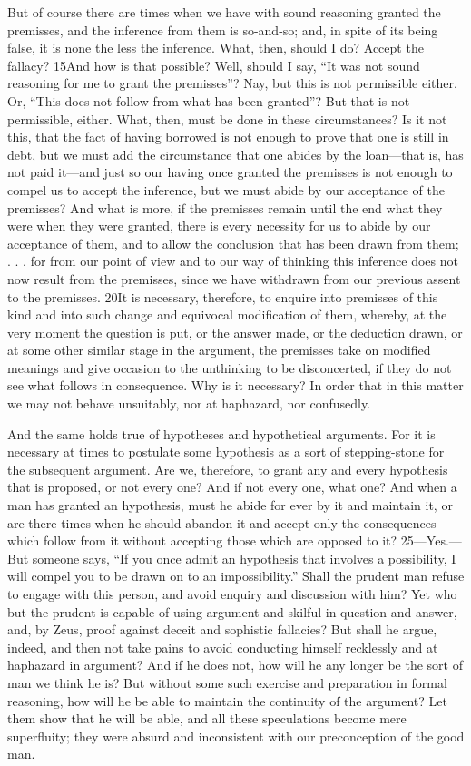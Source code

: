But of course there are times when we have with sound reasoning granted the premisses, and the inference from them is so-and-so; and, in spite of its being false, it is none the less the inference. What, then, should I do? Accept the fallacy? 15And how is that possible? Well, should I say, ``It was not sound reasoning for me to grant the premisses''? Nay, but this is not permissible either. Or, ``This does not follow from what has been granted''? But that is not permissible, either. What, then, must be done in these circumstances? Is it not this, that the fact of having borrowed is not enough to prove that one is still in debt, but we must add the circumstance that one abides by the loan—that is, has not paid it—and just so our having once granted the premisses is not enough to compel us to accept the inference, but we must abide by our acceptance of the premisses? And what is more, if the premisses remain until the end what they were when they were granted, there is every necessity for us to abide by our acceptance of them, and to allow the conclusion that has been drawn from them; . . . for from our point of view and to our way of thinking this inference does not now result from the premisses, since we have withdrawn from our previous assent to the premisses. 20It is necessary, therefore, to enquire into premisses of this kind and into such change and equivocal modification of them, whereby, at the very moment the question is put, or the answer made, or the deduction drawn, or at some other similar stage in the argument, the premisses take on modified meanings and give occasion to the unthinking to be disconcerted, if they do not see what follows in consequence. Why is it necessary? In order that in this matter we may not behave unsuitably, nor at haphazard, nor confusedly.

And the same holds true of hypotheses and hypothetical arguments. For it is necessary at times to postulate some hypothesis as a sort of stepping-stone for the subsequent argument. Are we, therefore, to grant any and every hypothesis that is proposed, or not every one? And if not every one, what one? And when a man has granted an hypothesis, must he abide for ever by it and maintain it, or are there times when he should abandon it and accept only the consequences which follow from it without accepting those which are opposed to it? 25—Yes.—But someone says, ``If you once admit an hypothesis that involves a possibility, I will compel you to be drawn on to an impossibility.'' Shall the prudent man refuse to engage with this person, and avoid enquiry and discussion with him? Yet who but the prudent is capable of using argument and skilful in question and answer, and, by Zeus, proof against deceit and sophistic fallacies? But shall he argue, indeed, and then not take pains to avoid conducting himself recklessly and at haphazard in argument? And if he does not, how will he any longer be the sort of man we think he is? But without some such exercise and preparation in formal reasoning, how will he be able to maintain the continuity of the argument? Let them show that he will be able, and all these speculations become mere superfluity; they were absurd and inconsistent with our preconception of the good man.

